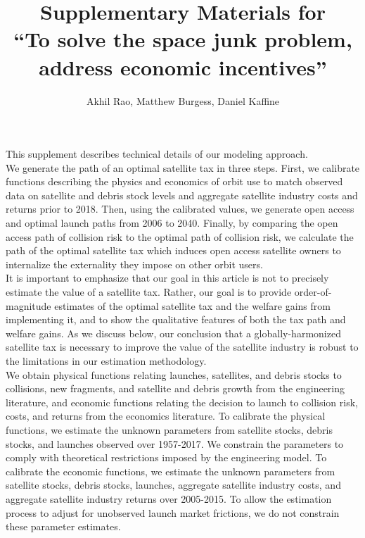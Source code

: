 \documentclass[12pt]{article}
\title{Supplementary Materials for\\``To solve the space junk problem, address economic incentives''}
\author{Akhil Rao, Matthew Burgess, Daniel Kaffine}
\begin{document}
	
	\maketitle
	
	\tableofcontents

\paragraph{}This supplement describes technical details of our modeling approach. \\

We generate the path of an optimal satellite tax in three steps. First, we calibrate functions describing the physics and economics of orbit use to match observed data on satellite and debris stock levels and aggregate satellite industry costs and returns prior to 2018. Then, using the calibrated values, we generate open access and optimal launch paths from 2006 to 2040. Finally, by comparing the open access path of collision risk to the optimal path of collision risk, we calculate the path of the optimal satellite tax which induces open access satellite owners to internalize the externality they impose on other orbit users. \\

It is important to emphasize that our goal in this article is not to precisely estimate the value of a satellite tax. Rather, our goal is to provide order-of-magnitude estimates of the optimal satellite tax and the welfare gains from implementing it, and to show the qualitative features of both the tax path and welfare gains. As we discuss below, our conclusion that a globally-harmonized satellite tax is necessary to improve the value of the satellite industry is robust to the limitations in our estimation methodology. \\

We obtain physical functions relating launches, satellites, and debris stocks to collisions, new fragments, and satellite and debris growth from the engineering literature, and economic functions relating the decision to launch to collision risk, costs, and returns from the economics literature. To calibrate the physical functions, we estimate the unknown parameters from satellite stocks, debris stocks, and launches observed over 1957-2017. We constrain the parameters to comply with theoretical restrictions imposed by the engineering model. To calibrate the economic functions, we estimate the unknown parameters from satellite stocks, debris stocks, launches, aggregate satellite industry costs, and aggregate satellite industry returns over 2005-2015. To allow the estimation process to adjust for unobserved launch market frictions, we do not constrain these parameter estimates. \\
\end{document}
